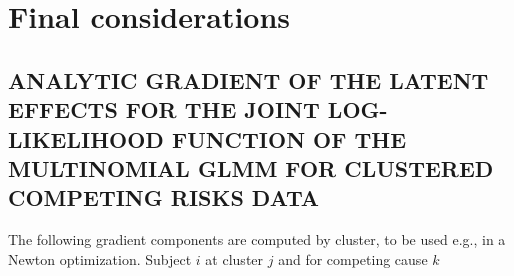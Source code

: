\documentclass[12pt, %
               openright, %
               oneside, %
               a4paper, %
               chapter=TITLE, %
               section=TITLE, %
               brazil,
               english %
]{abntex2}
\renewcommand{\ABNTEXchapterfontsize}{\bfseries\large}
\begin{document}
\chapter{Final considerations}
\label{cap:finalc}

\setlength{\afterchapskip}{\baselineskip}

\postextual
\begin{apendicesenv}
\partapendices
{}
\renewcommand{\ABNTEXchapterfontsize}{\ABNTEXsectionfont}

\chapter{ANALYTIC GRADIENT OF THE LATENT EFFECTS FOR THE JOINT
         LOG-LIKELIHOOD FUNCTION OF THE MULTINOMIAL GLMM FOR CLUSTERED
         COMPETING RISKS DATA}
\label{cap:appendixA}

The following gradient components are computed by cluster, to be used
e.g., in a Newton optimization. Subject \(i\) at cluster \(j\) and for
competing cause \(k\)


\end{apendicesenv}
\end{document}
